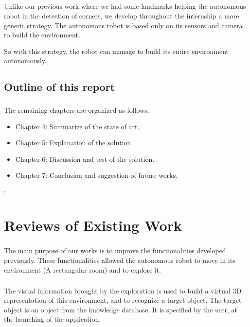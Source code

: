\documentclass[12pt]{report}
\begin{document}
	\paragraph{}
	Unlike our previous work where we had some landmarks helping the autonomous robot in the detection of corners, we develop throughout the internship a more generic strategy. The autonomous robot is based only on its sensors and camera to build the environment.
	
	So with this strategy, the robot can manage to build its entire environment autonomously.
	
	
	\section*{Outline of this report}
	\paragraph{}
	The remaining chapters are organized as follows:
	\begin{itemize}
		\item Chapter 4: Summarize of the state of art.
		\item Chapter 5: Explanation of the solution.
		\item Chapter 6: Discussion and test of the solution.
		\item Chapter 7: Conclusion and suggestion of future works.
	\end{itemize}: 
	
	
    \chapter{Reviews of Existing Work}
	
	\paragraph{}
	The main purpose of our works is to improve the functionalities developed previously. These functionalities allowed the autonomous robot to move in its environment (A rectangular room) and to explore it. 
	
	\paragraph{}
	The visual information brought by the exploration is used to build a virtual 3D representation of this environment, and to recognize a target object. The target object is an object from the knowledge database. It is specified by the user, at the launching of the application.
	
\end{document}
